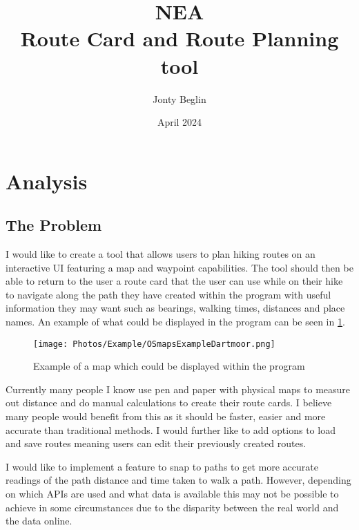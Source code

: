 \documentclass{article}
\title{NEA \\Route Card and Route Planning tool}
\author{Jonty Beglin}
\date{April 2024}
\begin{document}
\maketitle

\newpage

\tableofcontents

\newpage


\section{Analysis}

    \subsection{The Problem}

        I would like to create a tool that allows users to plan hiking routes on an interactive UI featuring a map and waypoint capabilities. The tool should then be able to return to the user a route card that the user can use while on their hike to navigate along the path they have created within the program with useful information they may want such as bearings, walking times, distances and place names. An example of what could be displayed in the program can be seen in \cref{fig:example_map_dartmoor}.

        \begin{figure}[h]
            \centering
            \texttt{[image: Photos/Example/OSmapsExampleDartmoor.png]}
            \caption{Example of a map which could be displayed within the program}
            \label{fig:example_map_dartmoor}
         \end{figure}

         Currently many people I know use pen and paper with physical maps to measure out distance and do manual calculations to create their route cards. I believe many people would benefit from this as it should be faster, easier and more accurate than traditional methods. I would further like to add options to load and save routes meaning users can edit their previously created routes.
         
         I would like to implement a feature to snap to paths to get more accurate readings of the path distance and time taken to walk a path. However, depending on which APIs are used and what data is available this may not be possible to achieve in some circumstances due to the disparity between the real world and the data online.
         
\end{document}
